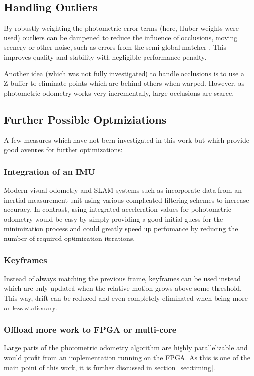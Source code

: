 \subsection{Handling Outliers}

By robustly weighting the photometric error terms (here, Huber weights were
used) outliers can be dampened to reduce the influence of occlusions, moving
scenery or other noise, such as errors from the semi-global matcher
\cite{comport2007odometry}. This improves quality and stability with negligible
performance penalty.

Another idea (which was not fully investigated) to handle occlusions is to use a
Z-buffer to eliminate points which are behind others when warped. However, as
photometric odometry works very incrementally, large occlusions are scarce.

\subsection{Further Possible Optmiziations}

A few measures which have not been investigated in this work but which provide
good avenues for further optimizations:

\subsubsection{Integration of an IMU}

Modern visual odometry and SLAM systems such as \cite{leutenegger2013keyframe}
incorporate data from an inertial measurement unit using various complicated
filtering schemes to increase accuracy.
In contrast, using integrated acceleration values for pohotometric odometry
would be easy by simply providing a good initial guess for the minimization
process and could greatly speed up perfomance by reducing the number of
required optimization iterations.

\subsubsection{Keyframes}

Instead of always matching the previous frame, keyframes can be used instead
which are only updated when the relative motion grows above some threshold.
This way, drift can be reduced and even completely eliminated when being more
or less stationary.

\subsubsection{Offload more work to FPGA or multi-core}

Large parts of the photometric odometry algorithm are highly parallelizable and
would profit from an implementation running on the FPGA. As this is one of the
main point of this work, it is further discussed in section~\ref{sec:timing}.
